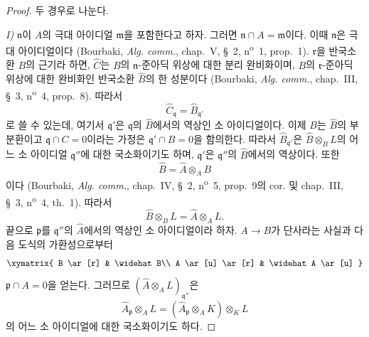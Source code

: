 \begin{proof}
두 경우로 나눈다.

\emph{I)} $\mathfrak n$이 $A$의 극대 아이디얼 $\mathfrak m$을 포함한다고
하자. 그러면 $\mathfrak n\cap A=\mathfrak m$이다. 이때
$\mathfrak n$은 극대 아이디얼이다 (Bourbaki, \emph{Alg. comm.},
chap.~V, §~2, n\textsuperscript{o}~1, prop.~1). $\mathfrak r$을 반국소환
$B$의 근기라 하면, $\widehat C$는 $B$의 $\mathfrak n$-준아딕 위상에
대한 분리 완비화이며, $B$의 $\mathfrak r$-준아딕 위상에 대한 완비화인
반국소환 $\widehat B$의 한 성분이다 (Bourbaki, \emph{Alg. comm.},
chap.~III, §~3, n\textsuperscript{o}~4, prop.~8). 따라서
\[
  \widehat C_\mathfrak q=\widehat B_{\mathfrak q'}
\]
로 쓸 수 있는데, 여기서 $\mathfrak q'$은 $\mathfrak q$의
$\widehat B$에서의 역상인 소 아이디얼이다. 이제 $B$는 $\widehat B$의
부분환이고 $\mathfrak q\cap C=0$이라는 가정은
$\mathfrak q'\cap B=0$을 함의한다. 따라서
$\widehat B_{\mathfrak q'}$은
$\widehat B\otimes_B L$의 어느 소 아이디얼 $\mathfrak q''$에 대한
국소화이기도 하며, $\mathfrak q'$은 $\mathfrak q''$의 $\widehat B$에서의
역상이다. 또한
\[
  \widehat B=\widehat A\otimes_A B
\]
이다 (Bourbaki, \emph{Alg. comm.}, chap.~IV, §~2,
n\textsuperscript{o}~5, prop.~9의 cor. 및 chap.~III, §~3,
n\textsuperscript{o}~4, th.~1). 따라서
\[
  \widehat B\otimes_B L=\widehat A\otimes_A L.
\]
끝으로 $\mathfrak p$를 $\mathfrak q''$의 $\widehat A$에서의 역상인 소
아이디얼이라 하자. $A\to B$가 단사라는 사실과 다음 도식의 가환성으로부터
\[
\xymatrix{
  B \ar[r] & \widehat B\\
  A \ar[u] \ar[r] & \widehat A \ar[u]
}
\]
$\mathfrak p\cap A=0$을 얻는다. 그러므로
$(\widehat A\otimes_A L)_{\mathfrak q''}$은
\[
  \widehat A_\mathfrak p\otimes_A L
  =(\widehat A_\mathfrak p\otimes_A K)\otimes_K L
\]
의 어느 소 아이디얼에 대한 국소화이기도 하다.



\end{proof}
